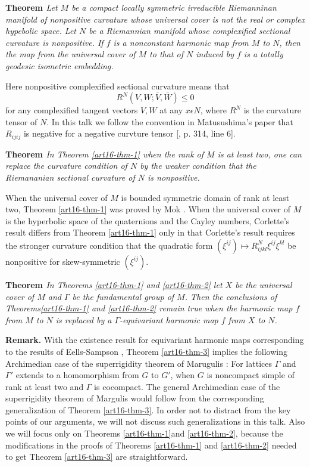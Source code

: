 \medskip
\noindent
{\bfseries Theorem  \label{art16-thm-1}} \textit{Let $M$ be a compact locally symmetric irreducible Riemanninan manifold of nonpositive curvature whose universal cover is not the real or complex hypebolic space. Let $N$ be a Riemannian manifold whose complexified sectional curvature is nonpositive. If $f$ is a nonconstant harmonic map from $M$ to $N$, then the map from the universal cover of $M$ to that of $N$ induced by $f$ is a totally geodesic isometric embedding.}

Here nonpositive complexified sectional curvature means that
$$
R^{N}(V, W; \overline{V}, \overline{W})\leq 0
$$
for any complexified tangent vectors $V, W$ at any $x \epsilon N$, where $R^{N}$ is the curvature tensor of $N$. In this talk we follow the convention in Matusushima's paper \cite{art16-keyMat} that $R_{ijij}$ is negative for a negative curvture tensor [\cite{art16-keyMat}, p. 314, line 6].

\medskip
\noindent
{\bfseries Theorem  \label{art16-thm-2}} \textit{In Theorem \ref{art16-thm-1} when the rank of $M$ is at least two, one can replace the curvature condition of $N$ by the weaker condition that the Riemananian sectional curvature of $N$ is nonpositive.}

When the universal cover of $M$ is bounded symmetric domain of rank at least two, Theorem \ref{art16-thm-1} was proved by Mok \cite{art16-keyMo}. When the universal cover of $M$ is the hyperbolic space of the quaternions and the Cayley numbers, Corlette's result differs from Theorem \ref{art16-thm-1} only in that Corlette's result requires the stronger curvature condition that the quadratic form $(\xi^{ij}) \mapsto R_{ijkl}^{N}\xi^{ij}\xi^{kl}$ be nonpositive for skew-symmetric $(\xi^{ij})$.

\medskip
\noindent
{\bfseries Theorem  \label{art16-thm-3}} \textit{In Theorems \ref{art16-thm-1} and \ref{art16-thm-2} let $X$ be the universal cover of $M$ and $\Gamma$ be the fundamental group of $M$. Then the conclusions of
Theorems\ref{art16-thm-1} and \ref{art16-thm-2} remain true when the harmonic map $f$ from $M$ to $N$ is replaced by a $\Gamma$-equivariant harmonic map $f$ from $X$ to $N$.}

\medskip
\noindent
{\bfseries Remark.} With the existence result for equivariant harmonic maps corresponding to the results of Eells-Sampson \cite{art16-keyE-S}, Theorem \ref{art16-thm-3} implies the following Archimedian case of the superrigidity theorem of Marugulis \cite{art16-keyMar}: For lattices $\Gamma$ and $\Gamma'$ extends to a homomorphism from $G$ to $G'$, when $G$ is noncompact simple of rank at least two and $\Gamma$ is cocompact. The general Archimedian case of the superrigidity theorem of Margulis would follow from the corresponding generalization of Theorem \ref{art16-thm-3}. In order not to distract from the key points of our arguments, we will not discuss such generalizations in this talk. Also we will focus only on Theorems \ref{art16-thm-1}and \ref{art16-thm-2}, because the modifications in the proofs of Theorems
\ref{art16-thm-1} and \ref{art16-thm-2} needed to get Theorem \ref{art16-thm-3} are straightforward. 

